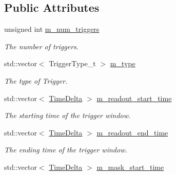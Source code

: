 \subsection*{Public Attributes}
\begin{DoxyCompactItemize}
\item 
\hypertarget{classTriggerInfo_a7850546ae941ddd4d525d013190ea1d9}{unsigned int \hyperlink{classTriggerInfo_a7850546ae941ddd4d525d013190ea1d9}{m\-\_\-num\-\_\-triggers}}\label{classTriggerInfo_a7850546ae941ddd4d525d013190ea1d9}

\begin{DoxyCompactList}\small\item\em The number of triggers. \end{DoxyCompactList}\item 
\hypertarget{classTriggerInfo_af7dd95a327a61bdf1021a3d390413fee}{std\-::vector$<$ Trigger\-Type\-\_\-t $>$ \hyperlink{classTriggerInfo_af7dd95a327a61bdf1021a3d390413fee}{m\-\_\-type}}\label{classTriggerInfo_af7dd95a327a61bdf1021a3d390413fee}

\begin{DoxyCompactList}\small\item\em The type of Trigger. \end{DoxyCompactList}\item 
\hypertarget{classTriggerInfo_a2417285ae1e8bf98c79d88bfaff7b570}{std\-::vector$<$ \hyperlink{classTimeDelta}{Time\-Delta} $>$ \hyperlink{classTriggerInfo_a2417285ae1e8bf98c79d88bfaff7b570}{m\-\_\-readout\-\_\-start\-\_\-time}}\label{classTriggerInfo_a2417285ae1e8bf98c79d88bfaff7b570}

\begin{DoxyCompactList}\small\item\em The starting time of the trigger window. \end{DoxyCompactList}\item 
\hypertarget{classTriggerInfo_a1b27e4798addb4ebbb2cb7eb14722483}{std\-::vector$<$ \hyperlink{classTimeDelta}{Time\-Delta} $>$ \hyperlink{classTriggerInfo_a1b27e4798addb4ebbb2cb7eb14722483}{m\-\_\-readout\-\_\-end\-\_\-time}}\label{classTriggerInfo_a1b27e4798addb4ebbb2cb7eb14722483}

\begin{DoxyCompactList}\small\item\em The ending time of the trigger window. \end{DoxyCompactList}\item 
\hypertarget{classTriggerInfo_aa687342103b521c5ab70ad378efd8290}{std\-::vector$<$ \hyperlink{classTimeDelta}{Time\-Delta} $>$ \hyperlink{classTriggerInfo_aa687342103b521c5ab70ad378efd8290}{m\-\_\-mask\-\_\-start\-\_\-time}}\label{classTriggerInfo_aa687342103b521c5ab70ad378efd8290}


\end{DoxyCompactItemize}
